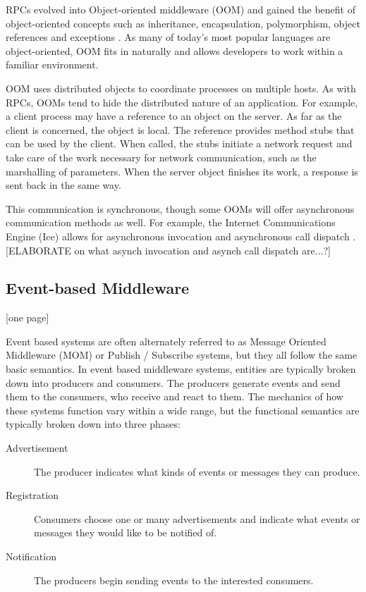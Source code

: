 \documentclass{acm_proc_article-sp}
\begin{document}
RPCs evolved into Object-oriented middleware (OOM) and gained the benefit of object-oriented concepts such as inheritance, encapsulation, polymorphism, object references and exceptions \cite{Pinus:2006p8367} \cite{Vinoski:2004p8371}.  As many of today's most popular languages are object-oriented, OOM fits in naturally and allows developers to work within a familiar environment.  

OOM uses distributed objects to coordinate processes on multiple hosts.  As with RPCs, OOMs tend to hide the distributed nature of an application.  For example, a client process may have a reference to an object on the server.  As far as the client is concerned, the object is local.  The reference provides method stubs that can be used by the client.  When called, the stubs initiate a network request and take care of the work necessary for network communication, such as the marshalling of parameters.  When the server object finishes its work, a response is sent back in the same way.  

This communication is synchronous, though some OOMs will offer asynchronous communication methods as well.  For example, the Internet Communications Engine (Ice) allows for asynchronous invocation and asynchronous call dispatch \cite{Henning:2004p8372}.  [ELABORATE on what asynch invocation and asynch call dispatch are...?]








\subsection{Event-based Middleware}

[one page]

Event based systems are often alternately referred to as Message Oriented Middleware (MOM) or Publish / Subscribe systems, but they all follow the same basic semantics. In event based middleware systems, entities are typically broken down into producers and consumers. The producers generate events and send them to the consumers, who receive and react to them. The mechanics of how these systems function vary within a wide range, but the functional semantics are typically broken down into three phases:

\begin{description}
\item[Advertisement] The producer indicates what kinds of events or messages they can produce.
\item[Registration] Consumers choose one or many advertisements and indicate what events or messages they would like to be notified of.
\item[Notification] The producers begin sending events to the interested consumers.
\end{description}
\end{document}
